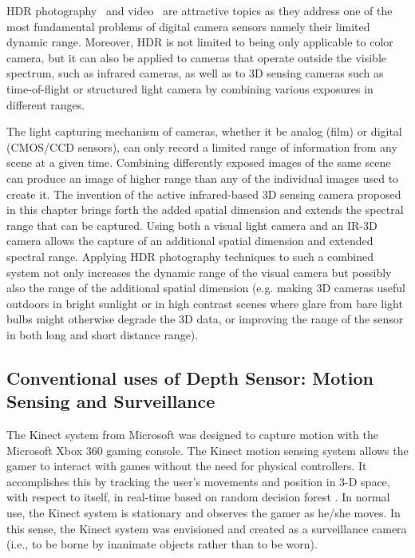 HDR photography~\cite{candocia1, candocia2, candocia3, wyckoff1962experimental, mannist} and video~\cite{mann2012hdrchitecture,lo2012high, mann2012realtime, HDRVideoCamera11, kang2003high} are attractive topics as they address one of the most fundamental problems of digital camera sensors namely their limited dynamic range. Moreover, HDR is not limited to being only applicable to color camera, but it can also be applied to cameras that operate outside the visible spectrum, such as infrared cameras, as well as to 3D sensing cameras such as time-of-flight or structured light camera by combining various exposures in different ranges. 

The light capturing mechanism of cameras, whether it be analog (film) or digital (CMOS/CCD sensors), can only record a limited range of information from any scene at a given time. Combining differently exposed images of the same scene can produce an image of higher range than any of the individual images used to create it. The invention of the active infrared-based 3D sensing camera proposed in this chapter brings forth the added spatial dimension and extends the spectral range that can be captured. Using both a visual light camera and an IR-3D camera allows the capture of an additional spatial dimension and extended spectral range. Applying HDR photography techniques to such a combined system not only increases the dynamic range of the visual camera but possibly also the range of the additional spatial dimension (e.g. making 3D cameras useful outdoors in bright sunlight or in high contrast scenes where glare from bare light bulbs might otherwise degrade the 3D data, or improving the range of the sensor in both long and short distance range).


\subsection{Conventional uses of Depth Sensor: Motion Sensing and Surveillance}

The Kinect system from Microsoft was designed to capture motion with the Microsoft Xbox 360 gaming console.  The Kinect motion sensing system allows the gamer to interact with games without the need for physical controllers. It accomplishes this by tracking the user's movements and position in 3-D space, with respect to itself, in real-time based on random decision forest \cite{criminisi2011decision}. In normal use, the Kinect system is stationary and observes the gamer as he/she moves.  In this sense, the Kinect system was envisioned and created as a surveillance camera (i.e., to be borne by inanimate objects rather than to be worn). 

